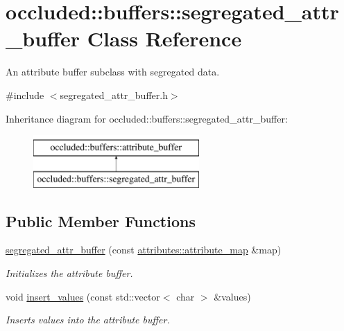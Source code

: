 \hypertarget{classoccluded_1_1buffers_1_1segregated__attr__buffer}{\section{occluded\+:\+:buffers\+:\+:segregated\+\_\+attr\+\_\+buffer Class Reference}
\label{classoccluded_1_1buffers_1_1segregated__attr__buffer}
}


An attribute buffer subclass with segregated data.  




{\ttfamily \#include $<$segregated\+\_\+attr\+\_\+buffer.\+h$>$}

Inheritance diagram for occluded\+:\+:buffers\+:\+:segregated\+\_\+attr\+\_\+buffer\+:\begin{figure}[H]
\begin{center}
\leavevmode
\includegraphics[height=2.000000cm]{classoccluded_1_1buffers_1_1segregated__attr__buffer}
\end{center}
\end{figure}
\subsection*{Public Member Functions}
\begin{DoxyCompactItemize}
\item 
\hyperlink{classoccluded_1_1buffers_1_1segregated__attr__buffer_ab822a9e4ccf2be069418224fc2663622}{segregated\+\_\+attr\+\_\+buffer} (const \hyperlink{classoccluded_1_1buffers_1_1attributes_1_1attribute__map}{attributes\+::attribute\+\_\+map} \&map)
\begin{DoxyCompactList}\small\item\em Initializes the attribute buffer. \end{DoxyCompactList}\item 
void \hyperlink{classoccluded_1_1buffers_1_1segregated__attr__buffer_a437ef88504021dc75d45dff010986128}{insert\+\_\+values} (const std\+::vector$<$ char $>$ \&values)
\begin{DoxyCompactList}\small\item\em Inserts values into the attribute buffer. \end{DoxyCompactList}\end{DoxyCompactItemize}
